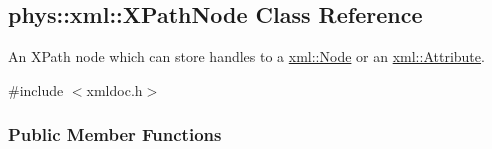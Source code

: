 \hypertarget{classphys_1_1xml_1_1XPathNode}{
\subsection{phys::xml::XPathNode Class Reference}
\label{df/dd4/classphys_1_1xml_1_1XPathNode}
}


An XPath node which can store handles to a \hyperlink{classphys_1_1xml_1_1Node}{xml::Node} or an \hyperlink{classphys_1_1xml_1_1Attribute}{xml::Attribute}.  




{\ttfamily \#include $<$xmldoc.h$>$}

\subsubsection*{Public Member Functions}
